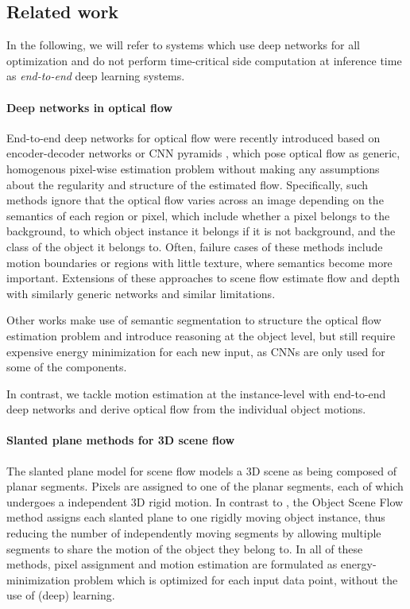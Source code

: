 \subsection{Related work}

In the following, we will refer to systems which use deep networks for all
optimization and do not perform time-critical side computation at inference time as
\emph{end-to-end} deep learning systems.

\paragraph{Deep networks in optical flow}

End-to-end deep networks for optical flow were recently introduced
based on encoder-decoder networks or CNN pyramids \cite{FlowNet, FlowNet2, SPyNet},
which pose optical flow as generic, homogenous pixel-wise estimation problem without making any assumptions
about the regularity and structure of the estimated flow.
Specifically, such methods ignore that the optical flow varies across an
image depending on the semantics of each region or pixel, which include whether a
pixel belongs to the background, to which object instance it belongs if it is not background,
and the class of the object it belongs to.
Often, failure cases of these methods include motion boundaries or regions with little texture,
where semantics become more important. %
Extensions of these approaches to scene flow estimate flow and depth
with similarly generic networks \cite{SceneFlowDataset} and similar limitations.

Other works \cite{FlowLayers, ESI, MRFlow} make use of semantic segmentation to structure %
the optical flow estimation problem and introduce reasoning at the object level,
but still require expensive energy minimization for each
new input, as CNNs are only used for some of the components.

In contrast, we tackle motion estimation at the instance-level with end-to-end
deep networks and derive optical flow from the individual object motions.

\paragraph{Slanted plane methods for 3D scene flow}
The slanted plane model for scene flow \cite{PRSF, PRSM} models a 3D scene as being
composed of planar segments. Pixels are assigned to one of the planar segments,
each of which undergoes a independent 3D rigid motion. %
In contrast to \cite{PRSF, PRSM}, the Object Scene Flow method \cite{KITTI2015}
assigns each slanted plane to one rigidly moving object instance, thus
reducing the number of independently moving segments by allowing multiple
segments to share the motion of the object they belong to.
In all of these methods, pixel assignment and motion estimation are formulated
as energy-minimization problem which is optimized for each input data point,
without the use of (deep) learning. %

